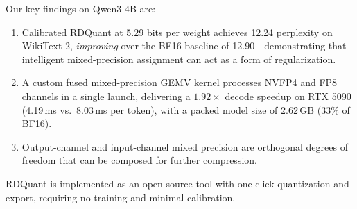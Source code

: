 \documentclass{article}
\begin{document}
Our key findings on Qwen3-4B are:
\begin{enumerate}
    \item Calibrated RDQuant at 5.29 bits per weight achieves 12.24 perplexity on WikiText-2, \emph{improving} over the BF16 baseline of 12.90---demonstrating that intelligent mixed-precision assignment can act as a form of regularization.
    \item A custom fused mixed-precision GEMV kernel processes NVFP4 and FP8 channels in a single launch, delivering a $1.92\times$ decode speedup on RTX 5090 (4.19\,ms vs.\ 8.03\,ms per token), with a packed model size of 2.62\,GB (33\% of BF16).
    \item Output-channel and input-channel mixed precision are orthogonal degrees of freedom that can be composed for further compression.
\end{enumerate}

RDQuant is implemented as an open-source tool with one-click quantization and export, requiring no training and minimal calibration.



\end{document}
